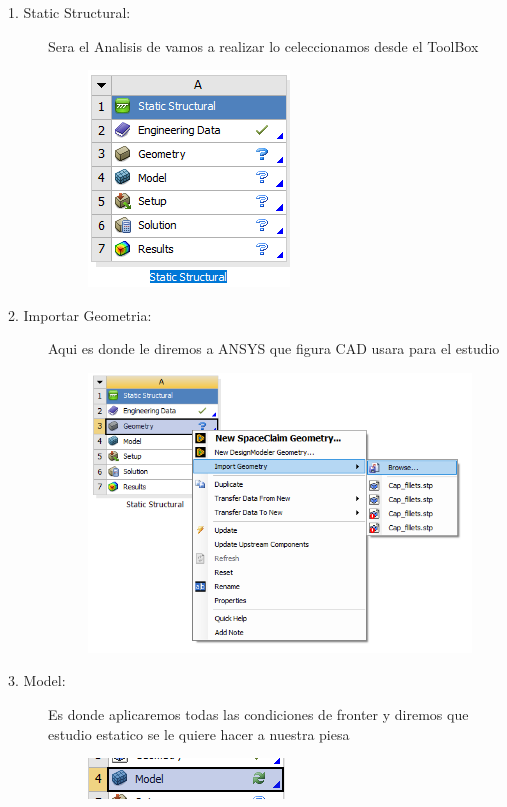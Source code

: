 \documentclass{article}
\begin{document}
\begin{description}
    \item[1. Static Structural: ] Sera el Analisis de vamos a realizar 
    lo celeccionamos desde el ToolBox  
    \begin{figure}[h!]
        \centering
        \includegraphics{img/StaticStructural.png}
    \end{figure} 
    
    \item[2. Importar Geometria: ] Aqui es donde le diremos a ANSYS que figura CAD usara 
    para el estudio 

    \begin{figure}[h!]
        \centering
        \includegraphics[scale=0.5]{img/importalGeometria.png}
    \end{figure}

    \item[3. Model: ] Es donde aplicaremos todas las condiciones de fronter
    y diremos que estudio estatico se le quiere hacer a nuestra piesa  

    \begin{figure}[h!]
        \centering
        \includegraphics{img/model.png}
    \end{figure}


\end{description}
\end{document}
